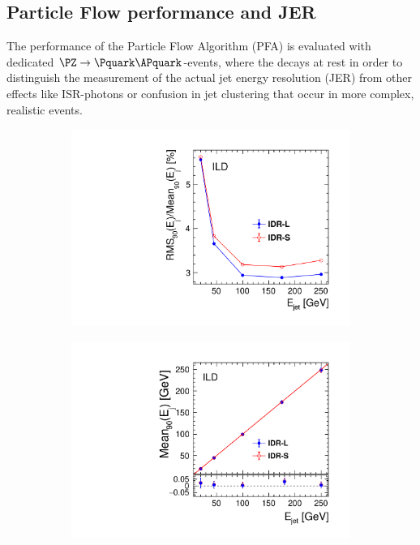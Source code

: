 \subsection{Particle Flow performance and JER}
The performance of the Particle Flow Algorithm (PFA) is evaluated with dedicated  $\PZ\rightarrow \Pquark\APquark$-events, where
the \PZ decays at rest in order to distinguish the measurement of the actual jet energy resolution (JER) from other effects like
ISR-photons or confusion in jet clustering that occur in more complex, realistic events.
%
% 
\begin{figure}[htbp]
\begin{subfigure}{0.49\hsize} 
 \includegraphics[width=\hsize]{Performance/fig/JERs_uds_l5_vs_s5.pdf}
 \caption{ \label{fig:perf:pfa_jer}}
 \end{subfigure}
\begin{subfigure}{0.49\hsize} 
 \includegraphics[width=\hsize]{Performance/fig/JESs_uds_l5_vs_s5.pdf}

\end{subfigure}
\end{figure}
